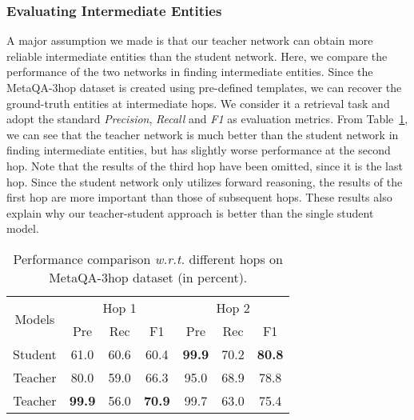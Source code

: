 \subsubsection{Evaluating Intermediate Entities}
A major assumption we made is that our teacher network can obtain more reliable intermediate entities than the student network. 
Here, we compare the performance of the two networks in finding intermediate entities. Since the MetaQA-3hop dataset is created using pre-defined templates, we can recover the ground-truth entities at intermediate hops. We consider it a retrieval task and adopt the standard \emph{Precision}, \emph{Recall} and \emph{F1} as evaluation metrics.  
From Table~\ref{tab:acc-int}, we can see that the teacher network is much better than the student network in finding intermediate entities, but has slightly worse performance at the second hop. 
Note that the results of the third hop have been omitted, since it is the last hop. 
Since the student network only utilizes forward reasoning, the results of the first hop are more important than those of subsequent hops. These results also explain why our teacher-student approach is better than the single student model. 

\begin{table}[htbp]
	\centering
	\caption{Performance comparison \emph{w.r.t.} different hops on MetaQA-3hop dataset (in percent).}
	\label{tab:acc-int}\begin{tabular}{c c c c| c c c}
\hline
			\multirow{2}{*}{Models}&\multicolumn{3}{c}{Hop 1}&\multicolumn{3}{c}{Hop 2}\\
			\cline{2-7}
			& Pre& Rec& F1& Pre& Rec& F1\\
			\hline
			Student&	61.0& 60.6& 60.4& \textbf{99.9}& 70.2& \textbf{80.8}\\
Teacher&	80.0& 59.0& 66.3& 95.0& 68.9& 78.8\\
			Teacher&	\textbf{99.9}& 56.0& \textbf{70.9}& 99.7& 63.0& 75.4\\
			\hline
		\end{tabular}\end{table}



